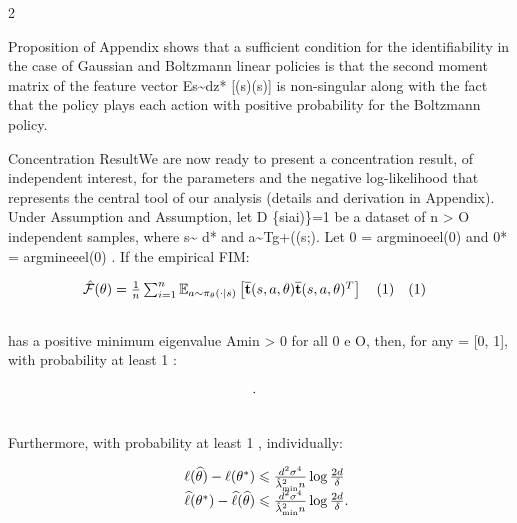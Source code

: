 \documentclass{article}
\begin{document}
\sloppy

\begin{paracol}{2}
\RaggedRight

Proposition of Appendix shows that a sufficient condition
for the identifiability in the case of Gaussian and Boltzmann
linear policies is that the second moment matrix of the feature vector Es\textasciitilde{}dz* [(s)(s)] is non-singular along with
the fact that the policy  plays each action with positive
probability for the Boltzmann policy.


Concentration ResultWe are now ready to present a concentration result, of independent interest, for the parameters
and the negative log-likelihood that represents the central
tool of our analysis (details and derivation in Appendix).
Under Assumption and Assumption, let D
\{siai)\}=1 be a dataset of n > O independent samples, where s\textasciitilde{} d* and a\textasciitilde{}Tg+((s;). Let
0 = argminoeel(0) and 0* = argmineeel(0) . If
the empirical FIM:


\begin{equation}
\begin{array} { r l } { \hat { \mathcal { F } } ( \theta ) = \frac { 1 } { n } \sum _ { i = 1 } ^ { n } \mathbb { E } _ { a \sim \pi _ { \theta } ( \cdot | s ) } \left [ \overline { \mathbf { t } } ( s, a, \theta ) \overline { \mathbf { t } } ( s, a, \theta ) ^ { T } \right ] \quad ( 1 ) } & { ( 1 ) } \\ & { \qquad }\end{array}
\end{equation}


has a positive minimum eigenvalue Amin > 0 for all 0 e O,
then, for any  = [0, 1], with probability at least 1  :


\begin{equation}
\begin{array} { r l } & { \cdot } \\ & { \qquad }\end{array}
\end{equation}


Furthermore, with probability at least 1  , individually:


\begin{equation}
\begin{array} { r l } & { \ell ( \widehat { \theta } ) - \ell ( \theta ^ { * } ) \leqslant \frac { d ^ { 2 } \sigma ^ { 4 } } { \hat { \lambda } _ { \operatorname* { m i n } } ^ { 2 } n } \log \frac { 2 d } { \delta } } \\ & { \widehat { \ell } ( \theta ^ { * } ) - \widehat { \ell } ( \widehat { \theta } ) \leqslant \frac { d ^ { 2 } \sigma ^ { 4 } } { \hat { \lambda } _ { \operatorname* { m i n } } ^ { 2 } n } \log \frac { 2 d } { \delta }. } \\ & { \qquad }\end{array}
\end{equation}



\end{paracol}
\end{document}
